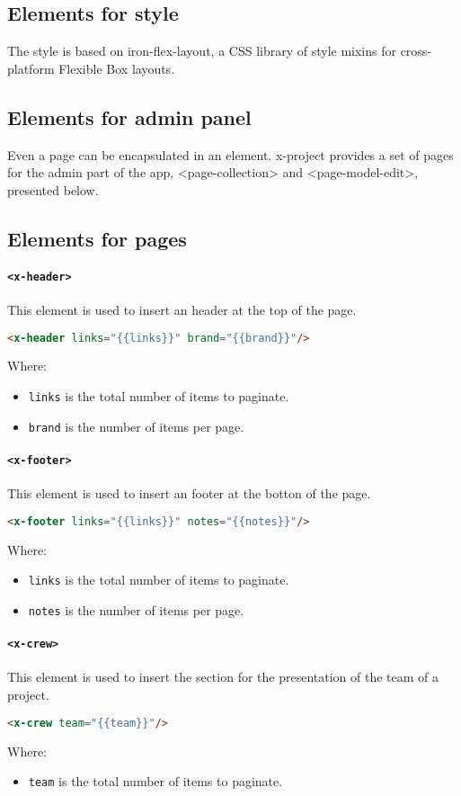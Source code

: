 \subsection{Elements for style}

The style is based on iron-flex-layout, a CSS library of style mixins for cross-platform Flexible Box layouts.

\subsection{Elements for admin panel}

Even a page can be encapsulated in an element. x-project provides a set of pages for the admin part of the app, <page-collection> and <page-model-edit>, presented below.

\subsection{Elements for pages}

\paragraph{\texttt{<x-header>}} This element is used to insert an header at the top of the page.
\begin{lstlisting}[language=html]
<x-header links="{{links}}" brand="{{brand}}"/>
\end{lstlisting}
Where:
\begin{itemize}
\item \texttt{links} is the total number of items to paginate.
\item \texttt{brand} is the number of items per page.
\end{itemize}
\paragraph{\texttt{<x-footer>}} This element is used to insert an footer at the botton of the page.
\begin{lstlisting}[language=html]
<x-footer links="{{links}}" notes="{{notes}}"/>
\end{lstlisting}
Where:
\begin{itemize}
\item \texttt{links} is the total number of items to paginate.
\item \texttt{notes} is the number of items per page.
\end{itemize}
\paragraph{\texttt{<x-crew>}} This element is used to insert the section for the presentation of the team of a project.
\begin{lstlisting}[language=html]
<x-crew team="{{team}}"/>\end{lstlisting}
Where:
\begin{itemize}
\item \texttt{team} is the total number of items to paginate.
\end{itemize}
